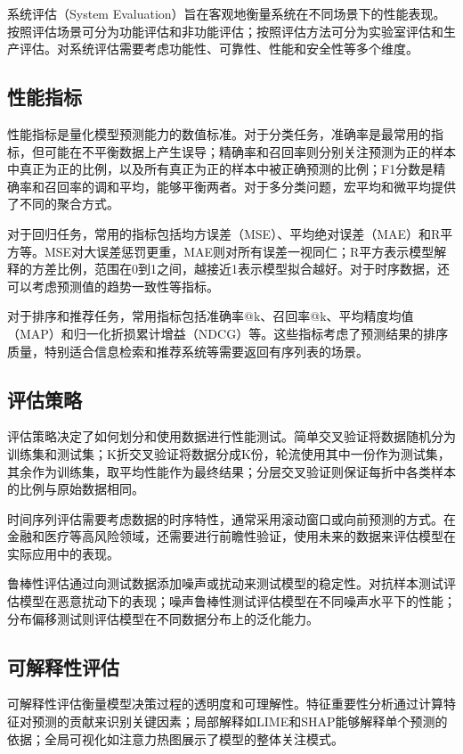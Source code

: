 系统评估（System Evaluation）旨在客观地衡量系统在不同场景下的性能表现。按照评估场景可分为功能评估和非功能评估；按照评估方法可分为实验室评估和生产评估。对系统评估需要考虑功能性、可靠性、性能和安全性等多个维度。

\subsection{性能指标}\label{sec:ch2-metrics}

性能指标是量化模型预测能力的数值标准。对于分类任务，准确率是最常用的指标，但可能在不平衡数据上产生误导；精确率和召回率则分别关注预测为正的样本中真正为正的比例，以及所有真正为正的样本中被正确预测的比例；F1分数是精确率和召回率的调和平均，能够平衡两者。对于多分类问题，宏平均和微平均提供了不同的聚合方式。

对于回归任务，常用的指标包括均方误差（MSE）、平均绝对误差（MAE）和R平方等。MSE对大误差惩罚更重，MAE则对所有误差一视同仁；R平方表示模型解释的方差比例，范围在0到1之间，越接近1表示模型拟合越好。对于时序数据，还可以考虑预测值的趋势一致性等指标。

对于排序和推荐任务，常用指标包括准确率@k、召回率@k、平均精度均值（MAP）和归一化折损累计增益（NDCG）等。这些指标考虑了预测结果的排序质量，特别适合信息检索和推荐系统等需要返回有序列表的场景。

\subsection{评估策略}\label{sec:ch2-strategy}

评估策略决定了如何划分和使用数据进行性能测试。简单交叉验证将数据随机分为训练集和测试集；K折交叉验证将数据分成K份，轮流使用其中一份作为测试集，其余作为训练集，取平均性能作为最终结果；分层交叉验证则保证每折中各类样本的比例与原始数据相同。

时间序列评估需要考虑数据的时序特性，通常采用滚动窗口或向前预测的方式。在金融和医疗等高风险领域，还需要进行前瞻性验证，使用未来的数据来评估模型在实际应用中的表现。

鲁棒性评估通过向测试数据添加噪声或扰动来测试模型的稳定性。对抗样本测试评估模型在恶意扰动下的表现；噪声鲁棒性测试评估模型在不同噪声水平下的性能；分布偏移测试则评估模型在不同数据分布上的泛化能力。

\subsection{可解释性评估}\label{sec:ch2-explainability}

可解释性评估衡量模型决策过程的透明度和可理解性。特征重要性分析通过计算特征对预测的贡献来识别关键因素；局部解释如LIME和SHAP能够解释单个预测的依据；全局可视化如注意力热图展示了模型的整体关注模式。

